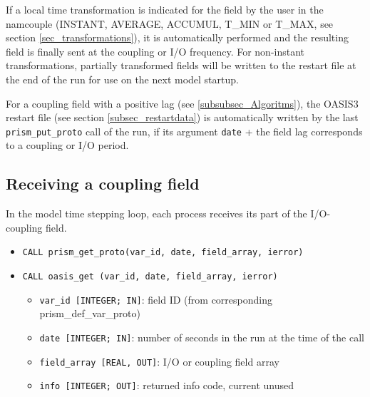 If a local time transformation is indicated for the field by
the user in the namcouple (INSTANT, AVERAGE, ACCUMUL, T\_MIN or T\_MAX,
see section \ref{sec_transformations}), it is automatically performed
and the resulting field is finally sent at the coupling or I/O
frequency.  For non-instant transformations, partially transformed
fields will be written to the restart file at the end of the run
for use on the next model startup.

For a coupling field with a positive lag (see
\ref{subsubsec_Algoritms}), the OASIS3 restart file (see section
\ref{subsec_restartdata}) is automatically written by the
last {\tt prism\_put\_proto} call of the run, if its argument {\tt date}
+ the field lag corresponds to a coupling or I/O period. 

\subsection{Receiving a coupling field}

In the model time stepping loop, each process
receives its part of the I/O-coupling field. 

\begin{itemize} 

\item {\tt CALL prism\_get\_proto(var\_id, date, field\_array, ierror)}
\item {\tt CALL oasis\_get       (var\_id, date, field\_array, ierror)}
\begin{itemize}
\item {\tt var\_id [INTEGER; IN]}: field ID (from
  corresponding prism\_def\_var\_proto)
\item {\tt date [INTEGER; IN]}: number of seconds in the run at the
time of the call
\item {\tt field\_array [REAL, OUT]}: I/O or coupling field array 
\item {\tt info [INTEGER; OUT]}: returned info code, current unused
\end{itemize}
\end{itemize}

